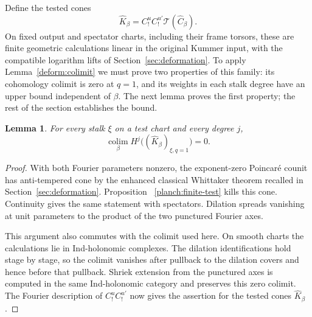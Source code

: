 \documentclass[11pt]{article}
\numberwithin{equation}{section}
\newtheorem{lemma}[theorem]{Lemma}
\theoremstyle{definition}
\theoremstyle{remark}
\begin{document}
Define the tested cones
\begin{equation}\label{planch:tested-cones}
 \widehat K_\beta
   =C_!^u C_!^{u'}\widehat{\mathcal T}(\widehat C_\beta).
\end{equation}
On fixed output and spectator charts, including their frame torsors,
these are finite geometric calculations linear in the original Kummer
input, with the compatible logarithm lifts of
Section~\ref{sec:deformation}.  To apply Lemma~\ref{deform:colimit} we
must prove two properties of this family: its cohomology colimit is zero
at $q=1$, and its weights in each stalk degree have an upper bound
independent of $\beta$.  The next lemma proves the first property; the
rest of the section establishes the bound.

\begin{lemma}
\label{planch:zero-colimit}
For every stalk $\xi$ on a test chart and every degree $j$,
\[
 \operatorname*{colim}_\beta
       H^j\bigl((\widehat K_\beta)_{\xi,q=1}\bigr)=0.
\]
\end{lemma}

\begin{proof}
With both Fourier parameters nonzero, the exponent-zero Poincar\'e
counit has anti-tempered cone by the enhanced classical Whittaker
theorem recalled in Section~\ref{sec:deformation}.  Proposition~
\ref{planch:finite-test} kills this cone.  Continuity gives the same
statement with spectators.  Dilation spreads vanishing at unit
parameters to the product of the two punctured Fourier axes.

This argument also commutes with the colimit used here.  On smooth
charts the calculations lie in Ind-holonomic complexes.  The dilation
identifications hold stage by stage, so the colimit vanishes after
pullback to the dilation covers and hence before that pullback.
Shriek extension from the punctured axes is computed in the same
Ind-holonomic category and preserves this zero colimit.  The Fourier
description of $C_!^u C_!^{u'}$ now gives the assertion for the
tested cones $\widehat K_\beta$.
\end{proof}
\end{document}
